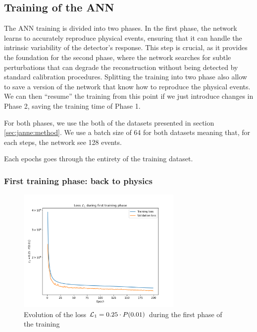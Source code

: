 \documentclass[../main.tex]{subfiles}
\begin{document}
\subsection{Training of the ANN}
\label{sec:janne:arch:training}

The ANN training is divided into two phases. In the first phase, the network learns to accurately reproduce physical events, ensuring that it can handle the intrinsic variability of the detector's response. This step is crucial, as it provides the foundation for the second phase, where the network searches for subtle perturbations that can degrade the reconstruction without being detected by standard calibration procedures. Splitting the training into two phase also allow to save a version of the network that know how to reproduce the physical events. We can then ``resume'' the training from this point if we just introduce changes in Phase 2, saving the training time of Phase 1.

For both phases, we use the both of the datasets presented in section \ref{sec:janne:method}. We use a batch size of 64 for both datasets meaning that, for each steps, the network see 128 events.

Each epochs goes through the entirety of the training dataset.

\subsubsection{First training phase: back to physics}
\label{sec:janne:results:identity}

\begin{figure}[ht]
  \centering
  \includegraphics[height=6cm]{images/janne/training/phase_1_penal.png}
  \caption{Evolution of the loss ${\cal L}_1 = 0.25 \cdot P(0.01)$ during the first phase of the training}
  \label{fig:jann:train:phase_1}
\end{figure}
\end{document}
